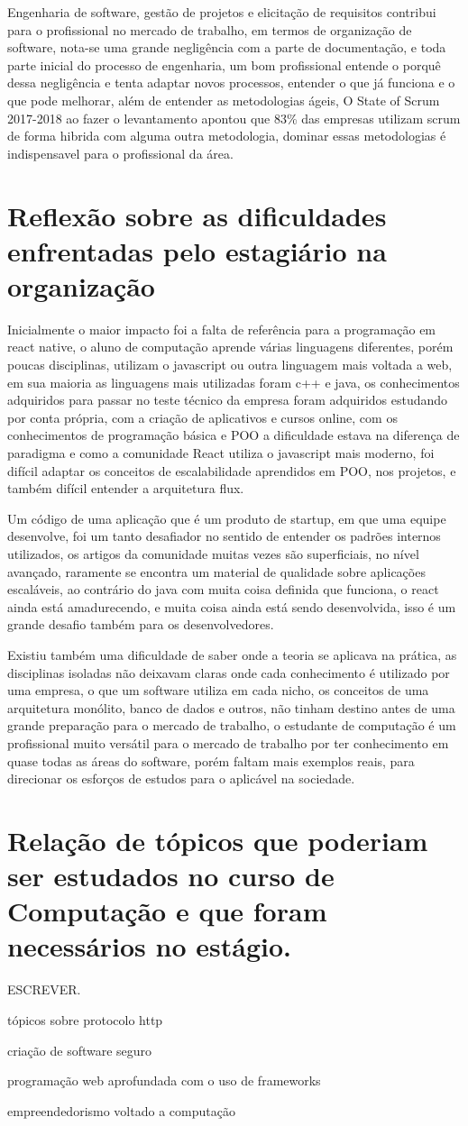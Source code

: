 \documentclass{ufersa}
\begin{document}
Engenharia de software, gestão de projetos e elicitação de requisitos contribui para o profissional no mercado de trabalho, em termos de organização de software, nota-se uma grande negligência com a parte de documentação, e toda parte inicial do processo de engenharia, um bom profissional entende o porquê dessa negligência e tenta adaptar novos processos, entender o que já funciona e o que pode melhorar, além de entender as metodologias ágeis, O State of Scrum 2017-2018 ao fazer o levantamento apontou que 83\% das empresas utilizam scrum de forma hibrida com alguma outra metodologia, dominar essas metodologias é indispensavel para o profissional da área.

\section{Reflexão sobre as dificuldades enfrentadas pelo estagiário na organização}
  Inicialmente o maior impacto foi a falta de referência para a programação em react native,  o aluno de computação aprende várias linguagens diferentes, porém poucas disciplinas, utilizam o javascript ou outra linguagem mais voltada a web, em sua maioria as linguagens mais utilizadas foram c++ e java, os conhecimentos adquiridos para passar no teste técnico da empresa foram adquiridos estudando por conta própria, com a criação de aplicativos e cursos online,  com os conhecimentos de programação básica e POO a dificuldade estava na diferença de paradigma e como a comunidade React utiliza o javascript mais moderno, foi difícil adaptar os conceitos de escalabilidade aprendidos em POO, nos projetos, e também difícil entender a arquitetura flux. 

Um código de uma aplicação que é um produto de startup, em que uma equipe desenvolve, foi um tanto desafiador no sentido de entender os padrões internos utilizados, os artigos da comunidade muitas vezes são superficiais, no nível avançado, raramente se encontra um material de qualidade sobre aplicações escaláveis, ao contrário do java com muita coisa definida que funciona, o react ainda está amadurecendo, e muita coisa ainda está sendo desenvolvida, isso é um grande desafio também para os desenvolvedores.

Existiu também uma dificuldade de saber onde a teoria se aplicava na prática, as disciplinas isoladas não deixavam claras onde cada conhecimento é utilizado por uma empresa, o que um software utiliza em cada nicho, os conceitos de uma arquitetura monólito, banco de dados e outros, não tinham destino antes de uma grande preparação para o mercado de trabalho, o estudante de computação é um profissional muito versátil para o mercado de trabalho por ter conhecimento em quase todas as áreas do software, porém faltam mais exemplos reais, para direcionar os esforços de estudos para o aplicável na sociedade.   

\section{Relação de tópicos que poderiam ser estudados no curso de Computação e que foram necessários no estágio.}
ESCREVER.

tópicos sobre protocolo http

criação de software seguro

programação web aprofundada com o uso de frameworks

empreendedorismo voltado a computação
\end{document}
